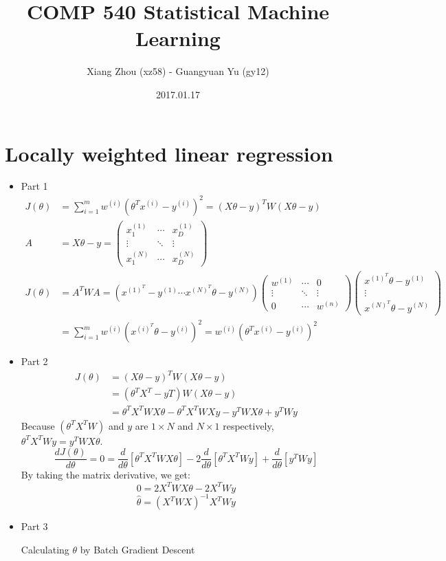 \documentclass[pdftex,11pt]{article}
\begin{document}
\title{COMP 540 Statistical Machine Learning}
\author{Xiang Zhou (xz58) - Guangyuan Yu (gy12)}
\date{2017.01.17}
\maketitle
\newcommand{\pr}{\mathbb{P}}

\section{Locally weighted linear regression}
\begin{itemize}
\item Part 1 \begin{align*}
	J(\theta)&=\sum^m_{i=1}w^{(i)}(\theta^Tx^{(i)}-y^{(i)})^2=(X\theta-y)^TW(X\theta-y)\\
	A&=X\theta-y=
	\begin{pmatrix}
		x_1^{(1)} & \cdots & x_D^{(1)}\\
		\vdots & \ddots & \vdots\\
		x_1^{(N)} & \cdots & x_D^{(N)}
	\end{pmatrix}\\
	J(\theta)&=A^TWA=(x^{(1)^T}-y^{(1)}\cdots x^{(N)^T}\theta-y^{(N)})
	\begin{pmatrix}
		w^{(1)} & \cdots & 0\\
		\vdots & \ddots & \vdots\\
		0 & \cdots & w^{(n)}
	\end{pmatrix}
	\begin{pmatrix}
		x^{(1)^T}\theta-y^{(1)}\\
		\vdots\\
		x^{(N)^T}\theta-y^{(N)}
	\end{pmatrix}\\
	&=\sum^m_{i=1}w^{(i)}(x^{(i)^T}\theta-y^{(i)})^2=w^{(i)}(\theta^Tx^{(i)}-y^{(i)})^2
	\end{align*}
\item Part 2 \begin{align*}
	J(\theta)&=(X\theta-y)^TW(X\theta-y)\\
	&=(\theta^TX^T-yT)W(X\theta-y)\\
	&=\theta^TX^TWX\theta-\theta^TX^TWXy-y^TWX\theta+y^TWy
	\end{align*}
	Because $(\theta^TX^TW)$ and $y$ are $1\times N$ and $N\times 1$ respectively, $\theta^TX^TWy=y^TWX\theta$.
	$$\frac{dJ(\theta)}{d\theta}=0=\frac{d}{d\theta}[\theta^TX^TWX\theta]-2\frac{d}{d\theta}[\theta^TX^TWy]+\frac{d}{d\theta}[y^TWy]$$
	By taking the matrix derivative, we get:
	$$0=2X^TWX\theta-2X^TWy$$
	$$\hat{\theta}=(X^TWX)^{-1}X^TWy$$
\item Part 3
\begin{algorithm}
  \caption{Calculating $\theta$ by Batch Gradient Descent}


\end{algorithm}
\end{itemize}
\end{document}
